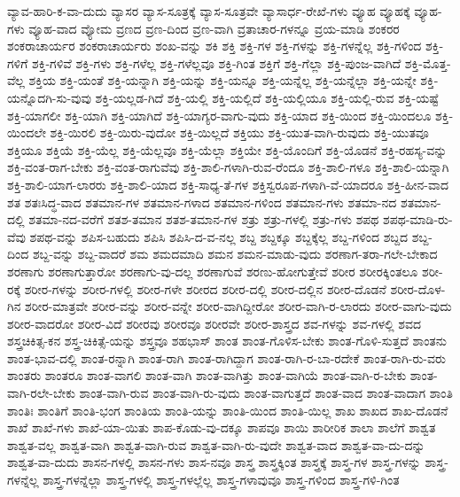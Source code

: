 {ವ್ಯಾವ-ಹಾರಿ-ಕ-ವಾ-ದುದು
ವ್ಯಾಸರ
ವ್ಯಾಸ-ಸೂತ್ರಕ್ಕೆ
ವ್ಯಾಸ-ಸೂತ್ರವೇ
ವ್ಯಾಸಾರ್ಧ-ರೇಖೆ-ಗಳು
ವ್ಯೂಹ
ವ್ಯೂಹಕ್ಕೆ
ವ್ಯೂಹ-ಗಳು
ವ್ಯೂಹ-ವಾದ
ವ್ಯೋಮ
ವ್ರಣದ
ವ್ರಣ-ದಿಂದ
ವ್ರಣ-ವಾಗಿ
ವ್ರತಾಚಾರ-ಗಳನ್ನೂ
ವ್ರಯ-ಮಾಡಿ
ಶಂಕರರ
ಶಂಕರಾಚಾರ್ಯರ
ಶಂಕರಾಚಾರ್ಯರು
ಶಂಖ-ವನ್ನು
ಶಕಿ
ಶಕ್ತಿ
ಶಕ್ತಿ-ಗಳ
ಶಕ್ತಿ-ಗಳನ್ನು
ಶಕ್ತಿ-ಗಳನ್ನೆಲ್ಲ
ಶಕ್ತಿ-ಗಳಿಂದ
ಶಕ್ತಿ-ಗಳಿಗೆ
ಶಕ್ತಿ-ಗಳಿವೆ
ಶಕ್ತಿ-ಗಳು
ಶಕ್ತಿ-ಗಳೆಲ್ಲ
ಶಕ್ತಿ-ಗಳೆಲ್ಲವೂ
ಶಕ್ತಿ-ಗಿಂತ
ಶಕ್ತಿಗೆ
ಶಕ್ತಿ-ಗೆಲ್ಲಾ
ಶಕ್ತಿ-ಪುಂಜ-ವಾಗಿದೆ
ಶಕ್ತಿ-ಮೊತ್ತ-ವೆಲ್ಲ
ಶಕ್ತಿಯ
ಶಕ್ತಿ-ಯಂತೆ
ಶಕ್ತಿ-ಯನ್ನಾಗಿ
ಶಕ್ತಿ-ಯನ್ನು
ಶಕ್ತಿ-ಯನ್ನೂ
ಶಕ್ತಿ-ಯನ್ನೆಲ್ಲ
ಶಕ್ತಿ-ಯನ್ನೆಲ್ಲಾ
ಶಕ್ತಿ-ಯನ್ನೇ
ಶಕ್ತಿ-ಯನ್ನೊದಗಿ-ಸು-ವುವು
ಶಕ್ತಿ-ಯಲ್ಲಡ-ಗಿದೆ
ಶಕ್ತಿ-ಯಲ್ಲಿ
ಶಕ್ತಿ-ಯಲ್ಲಿದೆ
ಶಕ್ತಿ-ಯಲ್ಲಿಯೂ
ಶಕ್ತಿ-ಯಲ್ಲಿ-ರುವ
ಶಕ್ತಿ-ಯಷ್ಟೆ
ಶಕ್ತಿ-ಯಾಗಲೀ
ಶಕ್ತಿ-ಯಾಗಿ
ಶಕ್ತಿ-ಯಾಗಿದೆ
ಶಕ್ತಿ-ಯಾಗ್ಯರ-ವಾಗು-ವುದು
ಶಕ್ತಿ-ಯಾದ
ಶಕ್ತಿ-ಯಿಂದ
ಶಕ್ತಿ-ಯಿಂದಲೂ
ಶಕ್ತಿ-ಯಿಂದಲೇ
ಶಕ್ತಿ-ಯಿರಲಿ
ಶಕ್ತಿ-ಯಿರು-ವುದೋ
ಶಕ್ತಿ-ಯಿಲ್ಲದೆ
ಶಕ್ತಿಯು
ಶಕ್ತಿ-ಯುತ-ವಾಗಿ-ರುವುದು
ಶಕ್ತಿ-ಯುತವೂ
ಶಕ್ತಿಯೂ
ಶಕ್ತಿಯೆ
ಶಕ್ತಿ-ಯೆಲ್ಲ
ಶಕ್ತಿ-ಯೆಲ್ಲವೂ
ಶಕ್ತಿ-ಯೆಲ್ಲಾ
ಶಕ್ತಿಯೇ
ಶಕ್ತಿ-ಯೊಂದಿಗೆ
ಶಕ್ತಿ-ಯೊಡನೆ
ಶಕ್ತಿ-ರಹಸ್ಯ-ವನ್ನು
ಶಕ್ತಿ-ವಂತ-ರಾಗ-ಬೇಕು
ಶಕ್ತಿ-ವಂತ-ರಾಗುವೆವು
ಶಕ್ತಿ-ಶಾಲಿ-ಗಳಾಗಿ-ರುವ-ರೆಂದೂ
ಶಕ್ತಿ-ಶಾಲಿ-ಗಳೂ
ಶಕ್ತಿ-ಶಾಲಿ-ಯನ್ನಾಗಿ
ಶಕ್ತಿ-ಶಾಲಿ-ಯಾಗ-ಲಾರರು
ಶಕ್ತಿ-ಶಾಲಿ-ಯಾದ
ಶಕ್ತಿ-ಸಾಧ್ಯ-ತೆ-ಗಳ
ಶಕ್ತಿಸ್ವರೂಪ-ಗಳಾಗಿ-ವೆ-ಯಾದರೂ
ಶಕ್ತಿ-ಹೀನ-ವಾದ
ಶತ
ಶತಃಸಿದ್ಧ-ವಾದ
ಶತಮಾನ-ಗಳ
ಶತಮಾನ-ಗಳಾದ
ಶತಮಾನ-ಗಳಿಂದ
ಶತಮಾನ-ಗಳು
ಶತಮಾ-ನದ
ಶತಮಾನ-ದಲ್ಲಿ
ಶತಮಾ-ನದ-ವರೆಗೆ
ಶತಶ-ತಮಾನ
ಶತಶ-ತಮಾನ-ಗಳ
ಶತ್ರು
ಶತ್ರು-ಗಳಲ್ಲಿ
ಶತ್ರು-ಗಳು
ಶಪಥ
ಶಪಥ-ಮಾಡಿ-ರು-ವೆವು
ಶಪಥ-ವನ್ನು
ಶಪಿಸ-ಬಹುದು
ಶಪಿಸಿ
ಶಪಿಸಿ-ದ-ವ-ನಲ್ಲ
ಶಬ್ದ
ಶಬ್ದಕ್ಕೂ
ಶಬ್ದಕ್ಕೆಲ್ಲ
ಶಬ್ದ-ಗಳಿಂದ
ಶಬ್ದದ
ಶಬ್ದ-ದಿಂದ
ಶಬ್ದ-ವನ್ನು
ಶಬ್ದ-ವಾದರೆ
ಶಮ
ಶಮದಮಾದಿ
ಶಮನ
ಶಮನ-ಮಾಡು-ವುದು
ಶರಣಾಗ-ತರಾ-ಗಲೇ-ಬೇಕಾದ
ಶರಣಾಗು
ಶರಣಾಗುತ್ತಾರೋ
ಶರಣಾಗು-ವು-ದಲ್ಲ
ಶರಣಾಗುವೆ
ಶರಣು-ಹೋಗುತ್ತೇವೆ
ಶರೀರ
ಶರೀರಕ್ಕಿಂತಲೂ
ಶರೀ-ರಕ್ಕೆ
ಶರೀರ-ಗಳನ್ನು
ಶರೀರ-ಗಳಲ್ಲಿ
ಶರೀರ-ಗಳೇ
ಶರೀರದ
ಶರೀರ-ದಲ್ಲಿ
ಶರೀರ-ದಲ್ಲಿನ
ಶರೀರ-ದೊಡನೆ
ಶರೀರ-ದೊಳ-ಗಿನ
ಶರೀರ-ಮಾತ್ರವೇ
ಶರೀರ-ವನ್ನು
ಶರೀರ-ವನ್ನೇ
ಶರೀರ-ವಾಗಿದ್ದೀರೋ
ಶರೀರ-ವಾಗಿ-ರ-ಲಾರದು
ಶರೀರ-ವಾಗು-ವುದು
ಶರೀರ-ವಾದರೋ
ಶರೀರ-ವಿದೆ
ಶರೀರವು
ಶರೀರವೂ
ಶರೀರವೇ
ಶರೀರ-ಶಾಸ್ತ್ರದ
ಶವ-ಗಳನ್ನು
ಶವ-ಗಳಲ್ಲಿ
ಶವದ
ಶಸ್ತ್ರಚಿಕಿತ್ಸ-ಕನ
ಶಸ್ತ್ರ-ಚಿಕಿತ್ಸೆ-ಯನ್ನು
ಶಸ್ತ್ರವೂ
ಶಹಭಾಸ್
ಶಾಂತ
ಶಾಂತ-ಗೊಳಿಸ-ಬೇಕು
ಶಾಂತ-ಗೊಳಿ-ಸುತ್ತದೆ
ಶಾಂತನು
ಶಾಂತ-ಭಾವ-ದಲ್ಲಿ
ಶಾಂತ-ರನ್ನಾಗಿ
ಶಾಂತ-ರಾಗಿ
ಶಾಂತ-ರಾಗಿದ್ದಾಗ
ಶಾಂತ-ರಾಗಿ-ರ-ಬಾ-ರದೇಕೆ
ಶಾಂತ-ರಾಗಿ-ರು-ವರು
ಶಾಂತರು
ಶಾಂತರೂ
ಶಾಂತ-ವಾಗಲಿ
ಶಾಂತ-ವಾಗಿ
ಶಾಂತ-ವಾಗಿತ್ತು
ಶಾಂತ-ವಾಗಿಯೆ
ಶಾಂತ-ವಾಗಿ-ರ-ಬೇಕು
ಶಾಂತ-ವಾಗಿ-ರಲೇ-ಬೇಕು
ಶಾಂತ-ವಾಗಿ-ರುವ
ಶಾಂತ-ವಾಗಿ-ರು-ವುದು
ಶಾಂತ-ವಾಗುತ್ತದೆ
ಶಾಂತ-ವಾದ
ಶಾಂತ-ವಾದಾಗ
ಶಾಂತಿ
ಶಾಂತಿಃ
ಶಾಂತಿಗೆ
ಶಾಂತಿ-ಭಂಗ
ಶಾಂತಿಯ
ಶಾಂತಿ-ಯನ್ನು
ಶಾಂತಿ-ಯಿಂದ
ಶಾಂತಿ-ಯಿಲ್ಲ
ಶಾಖ
ಶಾಖದ
ಶಾಖ-ದೊಡನೆ
ಶಾಖೆ
ಶಾಖೆ-ಗಳು
ಶಾಖೆ-ಯಾ-ಯಿತು
ಶಾಪ-ಕೊಡು-ವು-ದಕ್ಕೂ
ಶಾಪವೂ
ಶಾಯಿ
ಶಾರೀರಿಕ
ಶಾಲಾ
ಶಾಲೆಗೆ
ಶಾಶ್ವತ
ಶಾಶ್ವತ-ವಲ್ಲ
ಶಾಶ್ವತ-ವಾಗಿ
ಶಾಶ್ವತ-ವಾಗಿ-ರುವ
ಶಾಶ್ವತ-ವಾಗಿ-ರು-ವುದೇ
ಶಾಶ್ವತ-ವಾದ
ಶಾಶ್ವತ-ವಾ-ದು-ದನ್ನು
ಶಾಶ್ವತ-ವಾ-ದುದು
ಶಾಸನ-ಗಳಲ್ಲಿ
ಶಾಸನ-ಗಳು
ಶಾಸ-ನವೂ
ಶಾಸ್ತ್ರ
ಶಾಸ್ತ್ರಕ್ಕಿಂತ
ಶಾಸ್ತ್ರಕ್ಕೆ
ಶಾಸ್ತ್ರ-ಗಳ
ಶಾಸ್ತ್ರ-ಗಳನ್ನು
ಶಾಸ್ತ್ರ-ಗಳನ್ನೆಲ್ಲ
ಶಾಸ್ತ್ರ-ಗಳನ್ನೆಲ್ಲಾ
ಶಾಸ್ತ್ರ-ಗಳಲ್ಲಿ
ಶಾಸ್ತ್ರ-ಗಳಲ್ಲೆಲ್ಲ
ಶಾಸ್ತ್ರ-ಗಳಾವುವೂ
ಶಾಸ್ತ್ರ-ಗಳಿಂದ
ಶಾಸ್ತ್ರ-ಗಳಿ-ಗಿಂತ
}
